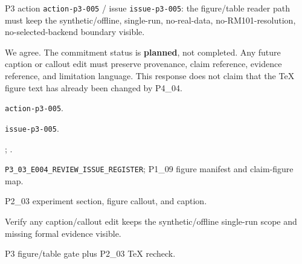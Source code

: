 \begin{revcomment}
P3 action \texttt{action-p3-005} / issue \texttt{issue-p3-005}: the figure/table reader path must keep the synthetic/offline, single-run, no-real-data, no-RM101-resolution, no-selected-backend boundary visible.
\end{revcomment}
\begin{revresponse}
We agree. The commitment status is \textbf{planned}, not completed. Any future caption or callout edit must preserve provenance, claim reference, evidence reference, and limitation language. This response does not claim that the TeX figure text has already been changed by P4\_04.

\begin{description}[leftmargin=3.2cm,style=nextline]
    \item[Action id] \texttt{action-p3-005}.
    \item[Issue id] \texttt{issue-p3-005}.
    \item[Source comments] \texttt{}; \texttt{}.
    \item[Evidence refs] \texttt{P3\_03\_E004\_REVIEW\_ISSUE\_REGISTER}; P1\_09 figure manifest and claim-figure map.
    \item[Target location] P2\_03 experiment section, figure callout, and caption.
    \item[Required change] Verify any caption/callout edit keeps the synthetic/offline single-run scope and missing formal evidence visible.
    \item[Validation gate] P3 figure/table gate plus P2\_03 TeX recheck.
\end{description}
\end{revresponse}
